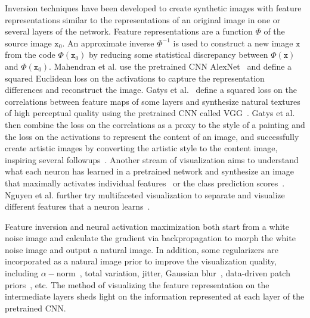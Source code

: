 \documentclass{article}
\begin{document}
Inversion techniques have been developed to create synthetic images with feature representations similar to the representations of an original image in one or several layers of the network.
Feature representations are a function $\Phi$ of the source image $\texttt{x}_0.$ An approximate inverse $\Phi^{-1}$ is used to construct a new image $\texttt{x}$ from the code $\Phi(\texttt{x}_0)$ by reducing some statistical discrepancy between $\Phi(\texttt{x})$ and $\Phi(\texttt{x}_0)$.
Mahendran et al. \cite{Mahendran2015CVPR} use the pretrained CNN AlexNet~\cite{Alex2012NIPS} and define a squared Euclidean loss on the activations to capture the representation differences and reconstruct the image.
Gatys et al.~\cite{Gatys2015texture, Gatys2015texture2} define a squared loss on the correlations between feature maps of some layers and synthesize natural textures of high perceptual quality using the pretrained CNN called VGG~\cite{Simonyan14VGG}. Gatys et al.~\cite{Gatys2015Style} then combine the loss on the correlations as a proxy to the style of a painting and the loss on the activations to represent the content of an image, and successfully create artistic images by converting the artistic style to the content image,
inspiring several followups~\cite{nikulin2016style,Johnson2016perceptual}.
Another stream of visualization aims to understand what each neuron has learned in a pretrained network and synthesize an image that maximally activates individual features~\cite{Erhan2009, yosinski2015ICML} or the class prediction scores~\cite{Simonyan13Visualise}. Nguyen et al. further try multifaceted visualization to separate and visualize different features that a neuron learns~\cite{Jason2016Multifaceted}.

Feature inversion and neural activation maximization both start from a white noise image and calculate the gradient via backpropagation to morph the white noise image and output a natural image.
In addition, some regularizers are incorporated as a natural image prior to improve the visualization quality, including $\alpha-$norm~\cite{Simonyan13Visualise}, total variation\cite{Mahendran2015CVPR}, jitter\cite{Mahendran2015CVPR}, Gaussian blur~\cite{yosinski2015ICML}, data-driven patch priors~\cite{Wei2015Understanding}, etc.
The method of visualizing the feature representation on the intermediate layers sheds light on the information represented at each layer of the pretrained CNN.
\end{document}
